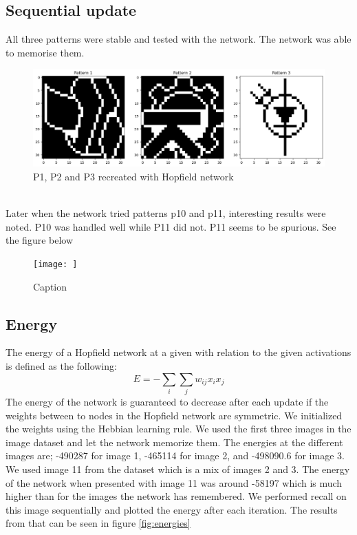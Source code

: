 \documentclass[a4paper]{article}
\begin{document}
\subsection{Sequential update}
All three patterns were stable and tested with the network. The network was able to memorise them. \\
\begin{figure}[htb]
    \centering
    \includegraphics[width=\textwidth]{Labs/Lab 3/Rakin/Results/3.2-3Patterns.png}
    \caption{P1, P2 and P3 recreated with Hopfield network }
    \label{fig:enter-label}
\end{figure}
\\Later when the network tried patterns p10 and p11, interesting results were noted. P10 was handled well while P11 did not. P11 seems to be spurious. See the figure below\\

\begin{figure}
    \centering
    \texttt{[image: ]}
    \caption{Caption}
    \label{fig:enter-label}
\end{figure}

\subsection{Energy}
The energy of a Hopfield network at a given with relation to the given activations is defined as the following:
$$
E = -\sum_i\sum_j w_{ij}x_ix_j
$$
The energy of the network is guaranteed to decrease after each update if the weights between to nodes in the Hopfield network are symmetric. We initialized the weights using the Hebbian learning rule. We used the first three images in the image dataset and let the network memorize them. The energies at the different images are; -490287 for image 1, -465114 for image 2, and -498090.6 for image 3. We used image 11 from the dataset which is a mix of images 2 and 3. The energy of the network when presented with image 11 was around -58197 which is much higher than for the images the network has remembered. We performed recall on this image sequentially and plotted the energy after each iteration. The results from that can be seen in figure \ref{fig:energies}
\end{document}
